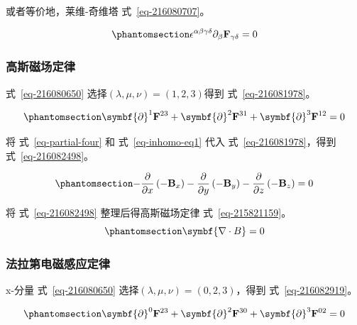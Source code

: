 \documentclass[
  chinese,
  a4paper,
  UTF8,
  12pt,
  oneside,
  openany]{ctexbook}
\begin{document}
或者等价地，莱维-奇维塔 式~\ref{eq-216080707}。

\begin{equation}\protect\phantomsection\label{eq-216080707}{
\epsilon^{\alpha\beta\gamma\delta}\partial_{\beta}\mathbf{F}_{\gamma\delta} = 0
}\end{equation}

\subsubsection{高斯磁场定律}\label{ux9ad8ux65afux78c1ux573aux5b9aux5f8b}

式~\ref{eq-216080650} 选择\((\lambda,\mu,\nu) = (1,2,3)\)得到
式~\ref{eq-216081978}。

\begin{equation}\protect\phantomsection\label{eq-216081978}{
\symbf{\partial}^{1}\mathbf{F}^{23} + \symbf{\partial}^{2}\mathbf{F}^{31} + \symbf{\partial}^{3}\mathbf{F}^{12} = 0
}\end{equation}

将 式~\ref{eq-partial-four} 和 式~\ref{eq-inhomo-eq1} 代入
式~\ref{eq-216081978}，得到 式~\ref{eq-216082498}。

\begin{equation}\protect\phantomsection\label{eq-216082498}{
- \frac{\partial}{\partial x}\left( - \mathbf{B}_{x} \right) - \frac{\partial}{\partial y}\left( - \mathbf{B}_{y} \right) - \frac{\partial}{\partial z}\left( - \mathbf{B}_{z} \right) = 0
}\end{equation}

将 式~\ref{eq-216082498} 整理后得高斯磁场定律 式~\ref{eq-215821159}。
~\begin{equation}\protect\phantomsection\label{eq-215821159}{\symbf{\nabla \cdot B} = 0}\end{equation}

\subsubsection{法拉第电磁感应定律}\label{ux6cd5ux62c9ux7b2cux7535ux78c1ux611fux5e94ux5b9aux5f8b}

x-分量 式~\ref{eq-216080650} 选择\((\lambda,\mu,\nu) = (0,2,3)\)，得到
式~\ref{eq-216082919}。

\begin{equation}\protect\phantomsection\label{eq-216082919}{
\symbf{\partial}^{0}\mathbf{F}^{23} + \symbf{\partial}^{2}\mathbf{F}^{30} + \symbf{\partial}^{3}\mathbf{F}^{02} = 0
}\end{equation}
\end{document}
